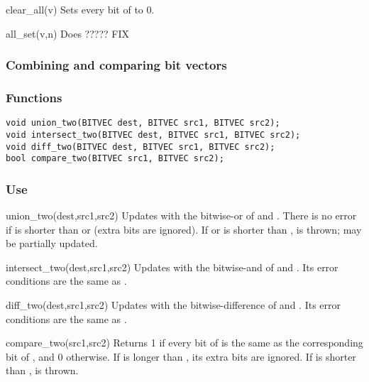 \begin{defun}{clear_all}{(v)}
Sets every bit of  to 0.
\end{defun}

\begin{defun}{all_set}{(v,n)}
Does ?????  FIX
\end{defun}

\subsubsection*{Combining and comparing bit vectors}

\subsubsection*{Functions}
\begin{verbatim}
void union_two(BITVEC dest, BITVEC src1, BITVEC src2);
void intersect_two(BITVEC dest, BITVEC src1, BITVEC src2);
void diff_two(BITVEC dest, BITVEC src1, BITVEC src2);
bool compare_two(BITVEC src1, BITVEC src2);
\end{verbatim}

\subsubsection*{Use}

\begin{defun}{union_two}{(dest,src1,src2)}
Updates  with the bitwise-or of  and .
There is no error if  is shorter than  or
 (extra bits are ignored).  If  or 
is shorter than ,  is thrown;
 may be partially updated.
\end{defun}

\begin{defun}{intersect_two}{(dest,src1,src2)}
Updates  with the bitwise-and of  and .
Its error conditions are the same as .
\end{defun}

\begin{defun}{diff_two}{(dest,src1,src2)}
Updates  with the bitwise-difference of  and
.  Its error conditions are the same as .
\end{defun}

\begin{defun}{compare_two}{(src1,src2)}
Returns 1 if every bit of
 is the same as the corresponding bit of , and 0
otherwise.  If  is longer than , its extra bits are
ignored.  If  is shorter than ,
 is thrown.
\end{defun}

